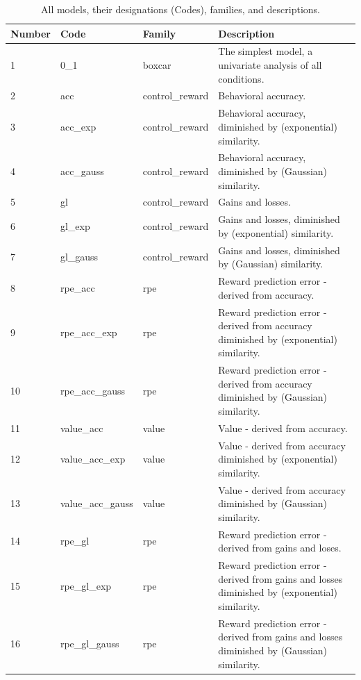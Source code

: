 \newpage
\begin{center}
    \begin{longtable}{ | l | l | l | p{6cm} |}
    \caption{All models, their designations (Codes), families, and descriptions.}\\
    \hline
    Number & Code & Family & Description \\ \hline
         1 & 0\_1 & boxcar & The simplest model, a univariate analysis of all conditions. \\ \hline
         2 & acc & control\_reward & Behavioral accuracy. \\ \hline
         3 & acc\_exp & control\_reward & Behavioral accuracy, diminished by (exponential) similarity. \\ \hline
         4 & acc\_gauss & control\_reward & Behavioral accuracy, diminished by (Gaussian) similarity. \\ \hline
         5 & gl & control\_reward & Gains and losses. \\ \hline 
         6 & gl\_exp & control\_reward & Gains and losses, diminished by (exponential) similarity. \\ \hline
         7 & gl\_gauss & control\_reward & Gains and losses, diminished by (Gaussian) similarity. \\ \hline
         8 & rpe\_acc & rpe & Reward prediction error - derived from accuracy. \\ \hline
         9 & rpe\_acc\_exp & rpe & Reward prediction error - derived from accuracy diminished by (exponential) similarity. \\ \hline
        10 & rpe\_acc\_gauss & rpe & Reward prediction error - derived from accuracy diminished by (Gaussian) similarity. \\ \hline
        11 & value\_acc & value & Value - derived from accuracy. \\ \hline
        12 & value\_acc\_exp & value & Value - derived from accuracy diminished by (exponential) similarity. \\ \hline
        13 & value\_acc\_gauss & value & Value - derived from accuracy diminished by (Gaussian) similarity. \\ \hline
        14 & rpe\_gl & rpe & Reward prediction error - derived from gains and loses. \\ \hline
        15 & rpe\_gl\_exp & rpe & Reward prediction error - derived from gains and losses diminished by (exponential) similarity. \\ \hline
        16 & rpe\_gl\_gauss & rpe & Reward prediction error - derived from gains and losses diminished by (Gaussian) similarity. \\ \hline

\end{longtable}
\end{center}
